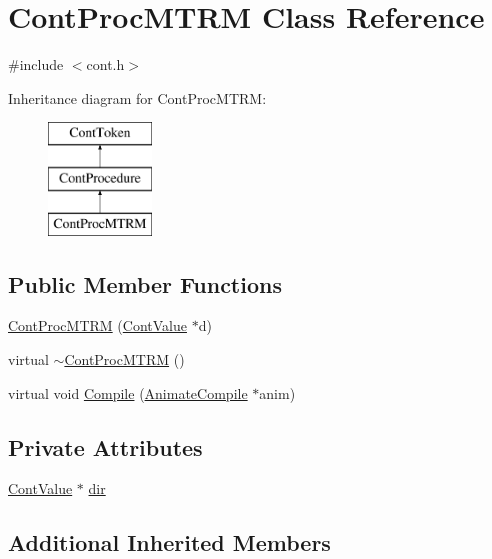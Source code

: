 \hypertarget{a00079}{\section{Cont\-Proc\-M\-T\-R\-M Class Reference}
\label{a00079}
}


{\ttfamily \#include $<$cont.\-h$>$}

Inheritance diagram for Cont\-Proc\-M\-T\-R\-M\-:\begin{figure}[H]
\begin{center}
\leavevmode
\includegraphics[height=3.000000cm]{a00079}
\end{center}
\end{figure}
\subsection*{Public Member Functions}
\begin{DoxyCompactItemize}
\item 
\hyperlink{a00079_a84f5f1790f643ad41b5bda32285da4a3}{Cont\-Proc\-M\-T\-R\-M} (\hyperlink{a00086}{Cont\-Value} $\ast$d)
\item 
virtual \hyperlink{a00079_abddcf273cfd3309aba4cf718da85e93b}{$\sim$\-Cont\-Proc\-M\-T\-R\-M} ()
\item 
virtual void \hyperlink{a00079_a7dbef5c4c51e4064a55efd9c3b4b8c45}{Compile} (\hyperlink{a00007}{Animate\-Compile} $\ast$anim)
\end{DoxyCompactItemize}
\subsection*{Private Attributes}
\begin{DoxyCompactItemize}
\item 
\hyperlink{a00086}{Cont\-Value} $\ast$ \hyperlink{a00079_a8c4e843c8734fcbcbde7982f4152589f}{dir}
\end{DoxyCompactItemize}
\subsection*{Additional Inherited Members}



